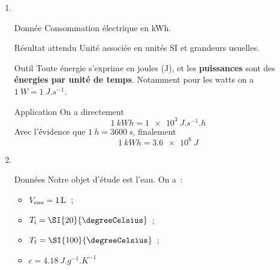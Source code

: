 \documentclass[a4paper, 12pt, final, garamond]{book}
\begin{document}
\begin{enumerate}
    \item ~
        \begin{tcbraster}[raster columns=3, raster equal height=rows]
            \begin{tcolorbox}[blankest, space to=\myspace]
                \begin{tcbraster}[raster columns=1]
                    \begin{NCdefi}[]{Donnée}
                        Consommation électrique en \si{kWh}.
                    \end{NCdefi}
                    \begin{NCprop}[add to natural height=\myspace]{Résultat attendu}
                        Unité associée en unités SI et grandeurs usuelles.
                    \end{NCprop}
                \end{tcbraster}
            \end{tcolorbox}
        \begin{NCrapp}[raster multicolumn=1]{Outil}
            Toute énergie s'exprime en joules (J), et les \textbf{puissances} sont des
            \textbf{énergies par unité de temps}. Notamment pour les
            watts on a $\SI{1}{W} = \SI{1}{J.s^{-1}}$.
        \end{NCrapp}
        \begin{NCexem}[raster multicolumn=1]{Application}
            On a directement
            \[ \SI{1}{kWh} = \SI{1e3}{J.s^{-1}.h}\]
            Avec l'évidence que $ \SI{1}{h} = \SI{3600}{s}$, finalement
            \[\boxed{\SI{1}{kWh} = \SI{3.6e6}{J}}\]
        \end{NCexem}
        \end{tcbraster}
    \item ~
        \begin{tcbraster}[raster columns=2, raster equal height=rows]
            \begin{NCdefi}[]{Données}
                Notre objet d'étude est l'eau. On a~:
                \begin{itemize}
                    \item $V_{\rm eau} = \SI{1}{L}$~;
                    \item $T_{\rm i} = \SI{20}{\degreeCelsius}$~;
                    \item $T_{\rm f} = \SI{100}{\degreeCelsius}$~;
                    \item $c = \SI{4.18}{J.g^{-1}.K^{-1}}$

\end{itemize}
\end{NCdefi}
\end{tcbraster}
\end{enumerate}
\end{document}

